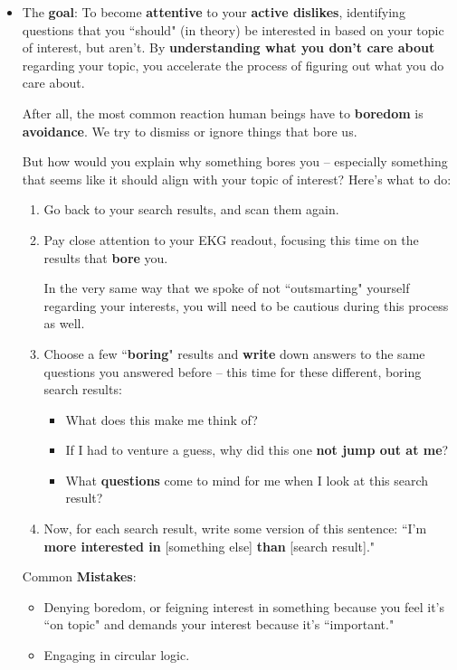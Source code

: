 \documentclass[11pt]{article}
\begin{document}
\begin{itemize}
\vspace{20pt}
\item \begin{exercise}

The \textbf{goal}: To become \textbf{attentive} to your \textbf{active dislikes}, identifying questions that you ``should" (in theory) be interested in based on your topic of interest, but aren’t. By \textbf{understanding what you don’t care about} regarding your topic, you accelerate the process of figuring out what you do care about.

After all, the most common reaction human beings have to \textbf{boredom} is \textbf{avoidance}. We try to dismiss or ignore things that bore us.

But how would you explain why something bores you -- especially something that seems like it should align with your topic of interest?
Here’s what to do:
\begin{enumerate}
\item Go back to your search results, and scan them again.
\item Pay close attention to your EKG readout, focusing this time on the results that \textbf{bore} you. 

In the very same way that we spoke of not ``outsmarting" yourself regarding your interests, you will need to be cautious during this process as well. 

\item Choose a few ``\textbf{boring}" results and \textbf{write} down answers to the same questions you answered before -- this time for these different, boring search results:
\begin{itemize}
\item What does this make me think of?

\item  If I had to venture a guess, why did this one \textbf{not jump out at me}?

\item What \textbf{questions} come to mind for me when I look at this search result?
\end{itemize}

\item Now, for each search result, write some version of this sentence: ``I’m \textbf{more interested in} [something else] \textbf{than} [search result]."
\end{enumerate}
\end{exercise}
Common \textbf{Mistakes}:
\begin{itemize}
\item Denying boredom, or feigning interest in something because you feel it’s ``on topic" and demands your interest because it’s ``important."
\item Engaging in circular logic. 
\end{itemize}



\end{itemize}
\end{document}
